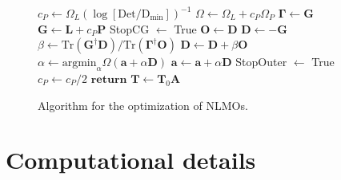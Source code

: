 \documentclass[aps,prl,reprint,amsmath,amssymb]{revtex4-1}
\begin{document}
\begin{figure}
\begin{algorithm}[H]
\begin{algorithmic}[1]
				\State $c_{P} \gets \Omega_{L}(\log [\text{Det} / \text{D}_{\text{min}} ])^{-1}$ 
			\EndIf
			\State $\Omega \gets \Omega_{L} + c_P \Omega_{P} $ 
				\State $\mathbf{\Gamma} \gets \mathbf{G}$ 
			\EndIf 
			\State $\mathbf{G} \gets \mathbf{L} + c_P \mathbf{P} $ 
				\State StopCG $\gets$ True
			\EndIf
					\State $\mathbf{O} \gets \mathbf{D}$ 
				\EndIf
				\State $\mathbf{D} \gets - \mathbf{G}$ 
					\State $\beta \gets \text{Tr}(\mathbf{G}^{\dagger} \mathbf{D})/\text{Tr}(\mathbf{\Gamma}^{\dagger}\mathbf{O})$
					\State $\mathbf{D} \gets \mathbf{D} + \beta \mathbf{O}$ 
				\EndIf 
				\State $\alpha \gets \text{argmin}_{\alpha} \Omega(\mathbf{a} + \alpha \mathbf{D})$ 
				\State $\mathbf{a}\gets \mathbf{a} + \alpha \mathbf{D}$ 
			\EndIf
			\State StopOuter $\gets$ True
		\EndIf
			\State $c_{P} \gets c_P / 2$ 
		\EndIf
	\State $\mathbf{return}$ $\mathbf{T} \gets \mathbf{T}_0 \mathbf{A} $ 
   \end{algorithmic}
\end{algorithm}
\caption{\label{fig:cg} Algorithm for the optimization of NLMOs.}
\end{figure}

\section{Computational details}
\end{document}

